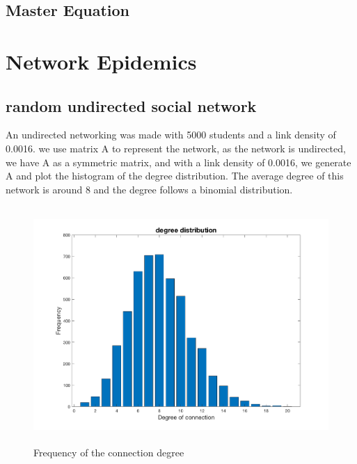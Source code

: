 \documentclass[12pt]{article}
\begin{document}
\newpage
\subsection{Master Equation}







\newpage
\section{Network Epidemics}
\doublespacing

\subsection{random undirected social network}

An undirected networking was made with 5000 students and a link density of 0.0016. we use matrix A to represent the network, as the network is undirected, we have A as a symmetric matrix, and with a link density of 0.0016, we generate A and plot the histogram of the degree distribution. The average degree of this network is around 8 and the degree follows a binomial distribution. 

\begin{figure}[H] %
\centering
\includegraphics[width = 12 cm, height = 9cm]{randomf.png}
\caption{Frequency of the connection degree}
\label{fig:randomconnect}
\end{figure}
\end{document}
